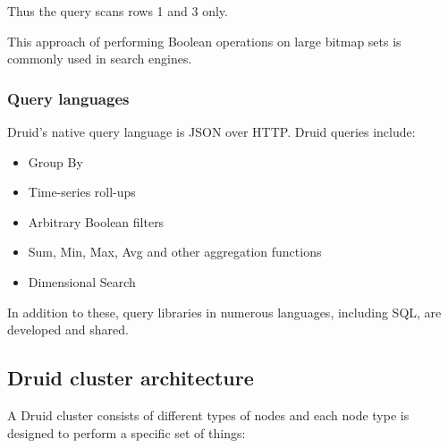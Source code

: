 \documentclass[letterpaper,10pt,english]{sphinxmanual}
\begin{document}
Thus the query scans rows 1 and 3 only.

This approach of performing Boolean operations on large bitmap sets is commonly used in search engines.


\subsubsection{Query languages}
\label{\detokenize{discovery/part01/druid_features:id5}}
Druid’s native query language is JSON over HTTP. Druid queries include:
\begin{itemize}
\item {} 
Group By

\item {} 
Time-series roll-ups

\item {} 
Arbitrary Boolean filters

\item {} 
Sum, Min, Max, Avg and other aggregation functions

\item {} 
Dimensional Search

\end{itemize}

In addition to these, query libraries in numerous languages, including SQL, are developed and shared.


\subsection{Druid cluster architecture}
\label{\detokenize{discovery/part01/druid_nodes:druid}}\label{\detokenize{discovery/part01/druid_nodes::doc}}
A Druid cluster consists of different types of nodes and each node type is designed to perform a specific set of things:
\begin{quote}

\begin{figure}[H]
\centering

\noindent{}
\end{figure}
\end{quote}
\end{document}

